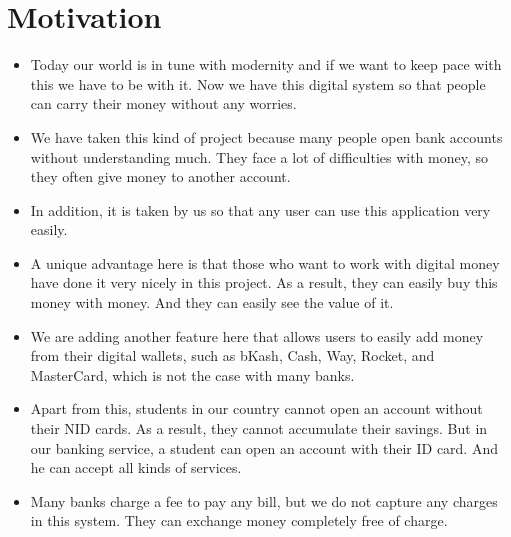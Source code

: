 \documentclass{article}
\begin{document}
\section{Motivation}
\begin{itemize}
\item Today our world is in tune with modernity and if we want to keep pace with this we have to be with it. Now we have this digital system so that people can carry their money without any worries.
\item We have taken this kind of project because many people open bank accounts without understanding much. They face a lot of difficulties with money, so they often give money to another account.
\item In addition, it is taken by us so that any user can use this application very easily.
\item A unique advantage here is that those who want to work with digital money have done it very nicely in this project. As a result, they can easily buy this money with money. And they can easily see the value of it.
\item We are adding another feature here that allows users to easily add money from their digital wallets, such as bKash, Cash, Way, Rocket, and MasterCard, which is not the case with many banks.
\item Apart from this, students in our country cannot open an account without their NID cards. As a result, they cannot accumulate their savings. But in our banking service, a student can open an account with their ID card. And he can accept all kinds of services.
\item Many banks charge a fee to pay any bill, but we do not capture any charges in this system. They can exchange money completely free of charge.

\end{itemize}
\end{document}
